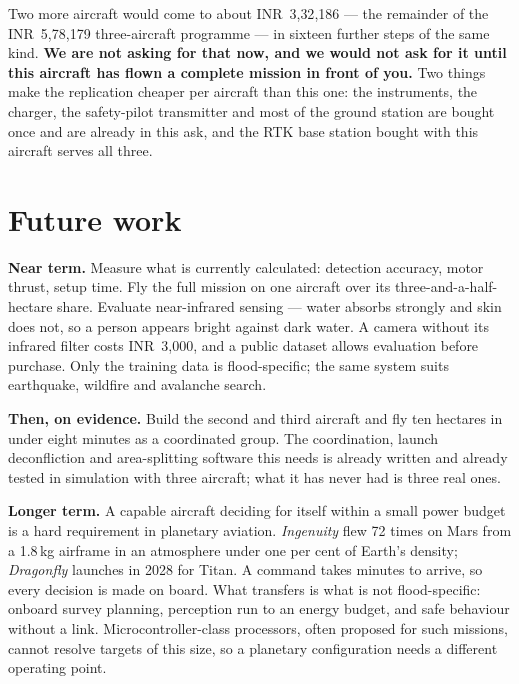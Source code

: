 \documentclass[11pt,a4paper]{article}
\newcommand{\rs}[1]{\mbox{INR~#1}}
\begin{document}
Two more aircraft would come to about \rs{3{,}32{,}186} --- the remainder of
the \rs{5{,}78{,}179} three-aircraft programme --- in sixteen further steps of
the same kind. \textbf{We are not asking for that now, and we would not ask for
it until this aircraft has flown a complete mission in front of you.} Two
things make the replication cheaper per aircraft than this one: the
instruments, the charger, the safety-pilot transmitter and most of the ground
station are bought once and are already in this ask, and the RTK base station
bought with this aircraft serves all three.

\section{Future work}

\textbf{Near term.} Measure what is currently calculated: detection accuracy,
motor thrust, setup time. Fly the full mission on one aircraft over its
three-and-a-half-hectare share. Evaluate near-infrared sensing --- water
absorbs strongly and skin does not, so a person appears bright against dark
water. A camera without its infrared filter costs \rs{3{,}000}, and a public
dataset allows evaluation before purchase. Only the training data is
flood-specific; the same system suits earthquake, wildfire and avalanche
search.

\textbf{Then, on evidence.} Build the second and third aircraft and fly ten
hectares in under eight minutes as a coordinated group. The coordination,
launch deconfliction and area-splitting software this needs is already written
and already tested in simulation with three aircraft; what it has never had is
three real ones.

\textbf{Longer term.} A capable aircraft deciding for itself within a small
power budget is a hard requirement in planetary aviation. \emph{Ingenuity} flew
72 times on Mars from a 1.8\,kg airframe in an atmosphere under one per cent of
Earth's density; \emph{Dragonfly} launches in 2028 for Titan. A command takes
minutes to arrive, so every decision is made on board. What transfers is what is
not flood-specific: onboard survey planning, perception run to an energy budget,
and safe behaviour without a link. Microcontroller-class processors, often
proposed for such missions, cannot resolve targets of this size, so a planetary
configuration needs a different operating point.

\end{document}
